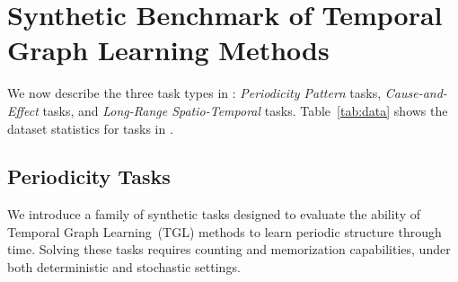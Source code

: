 


\section{Synthetic Benchmark of Temporal Graph Learning Methods}
 We now describe the three task types in \benchmarkname: \textit{Periodicity Pattern} tasks, \textit{Cause-and-Effect} tasks, and \emph{Long-Range Spatio-Temporal} tasks.
Table~\ref{tab:data} shows the dataset statistics for tasks in \benchmarkname. 


\begin{table}[t]
\caption{\benchmarkname dataset statistics and characteristics. } \label{tab:data} 
\end{table}



\subsection{Periodicity Tasks}\label{synth-benchmark:periodicity}

We introduce a family of synthetic tasks designed to evaluate the ability of Temporal Graph Learning~(TGL) methods to learn periodic structure through time. Solving these tasks requires counting and memorization capabilities, under both deterministic and stochastic settings.

